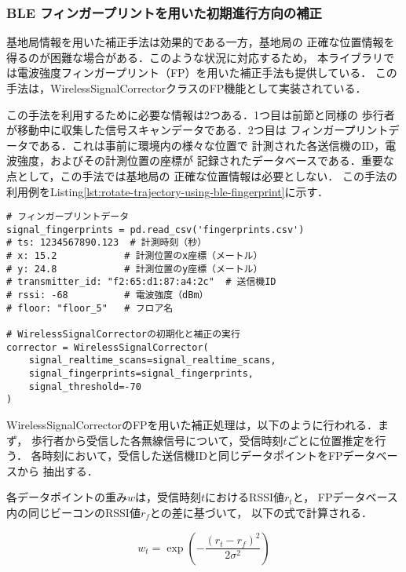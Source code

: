 
\subsubsection{BLE フィンガープリントを用いた初期進行方向の補正}

基地局情報を用いた補正手法は効果的である一方，基地局の
正確な位置情報を得るのが困難な場合がある．このような状況に対応するため，
本ライブラリでは電波強度フィンガープリント（FP）を用いた補正手法も提供している．
この手法は，WirelessSignalCorrectorクラスのFP機能として実装されている．


この手法を利用するために必要な情報は2つある．1つ目は前節と同様の
歩行者が移動中に収集した信号スキャンデータである．2つ目は
フィンガープリントデータである．これは事前に環境内の様々な位置で
計測された各送信機のID，電波強度，およびその計測位置の座標が
記録されたデータベースである．重要な点として，この手法では基地局の
正確な位置情報は必要としない．
この手法の利用例をListing\ref{lst:rotate-trajectory-using-ble-fingerprint}に示す．

\begin{lstlisting}[caption={WirelessSignalCorrectorの使用例},label=lst:rotate-trajectory-using-fingerprint,float=ht]
# フィンガープリントデータ
signal_fingerprints = pd.read_csv('fingerprints.csv')
# ts: 1234567890.123  # 計測時刻（秒）
# x: 15.2            # 計測位置のx座標（メートル）
# y: 24.8            # 計測位置のy座標（メートル）
# transmitter_id: "f2:65:d1:87:a4:2c"  # 送信機ID
# rssi: -68          # 電波強度（dBm）
# floor: "floor_5"   # フロア名

# WirelessSignalCorrectorの初期化と補正の実行
corrector = WirelessSignalCorrector(
    signal_realtime_scans=signal_realtime_scans,
    signal_fingerprints=signal_fingerprints,
    signal_threshold=-70
)
\end{lstlisting}

WirelessSignalCorrectorのFPを用いた補正処理は，以下のように行われる．まず，
歩行者から受信した各無線信号について，受信時刻$t$ごとに位置推定を行う．
各時刻において，受信した送信機IDと同じデータポイントをFPデータベースから
抽出する．

各データポイントの重み$w$は，受信時刻$t$におけるRSSI値$r_t$と，
FPデータベース内の同じビーコンのRSSI値$r_f$との差に基づいて，
以下の式で計算される．

\begin{equation}
w_t = \exp\left(-\frac{(r_t - r_f)^2}{2\sigma^2}\right)
\end{equation}

